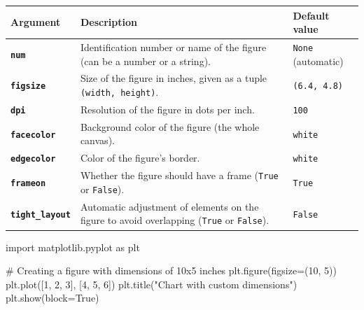 \documentclass[
  english,
  letterpaper,
  DIV=11,
  numbers=noendperiod]{scrreprt}
\newenvironment{Shaded}{\begin{snugshade}}{\end{snugshade}}
\newcommand{\CommentTok}[1]{\textcolor[rgb]{0.37,0.37,0.37}{#1}}
\newcommand{\DecValTok}[1]{\textcolor[rgb]{0.68,0.00,0.00}{#1}}
\newcommand{\ImportTok}[1]{\textcolor[rgb]{0.00,0.46,0.62}{#1}}
\newcommand{\NormalTok}[1]{\textcolor[rgb]{0.00,0.23,0.31}{#1}}
\newcommand{\OperatorTok}[1]{\textcolor[rgb]{0.37,0.37,0.37}{#1}}
\newcommand{\StringTok}[1]{\textcolor[rgb]{0.13,0.47,0.30}{#1}}
\newcommand{\VariableTok}[1]{\textcolor[rgb]{0.07,0.07,0.07}{#1}}
\newcounter{none} %
\begin{document}
{\def\LTcaptype{none} %
\begin{longtable}[]{@{}
  >{\raggedright\arraybackslash}p{}
  >{\raggedright\arraybackslash}p{}
  >{\raggedright\arraybackslash}p{}@{}}
\toprule\noalign{}
\begin{minipage}[b]{\linewidth}\raggedright
Argument
\end{minipage} & \begin{minipage}[b]{\linewidth}\raggedright
Description
\end{minipage} & \begin{minipage}[b]{\linewidth}\raggedright
Default value
\end{minipage} \\
\midrule\noalign{}
\endhead
\bottomrule\noalign{}
\endlastfoot
\textbf{\texttt{num}} & Identification number or name of the figure (can
be a number or a string). & \texttt{None} (automatic) \\
\textbf{\texttt{figsize}} & Size of the figure in inches, given as a
tuple \texttt{(width,\ height)}. & \texttt{(6.4,\ 4.8)} \\
\textbf{\texttt{dpi}} & Resolution of the figure in dots per inch. &
\texttt{100} \\
\textbf{\texttt{facecolor}} & Background color of the figure (the whole
canvas). & \texttt{white} \\
\textbf{\texttt{edgecolor}} & Color of the figure's border. &
\texttt{white} \\
\textbf{\texttt{frameon}} & Whether the figure should have a frame
(\texttt{True} or \texttt{False}). & \texttt{True} \\
\textbf{\texttt{tight\_layout}} & Automatic adjustment of elements on
the figure to avoid overlapping (\texttt{True} or \texttt{False}). &
\texttt{False} \\
\end{longtable}
}

\begin{Shaded}
\begin{Highlighting}[]
\ImportTok{import}\NormalTok{ matplotlib.pyplot }\ImportTok{as}\NormalTok{ plt}

\CommentTok{\# Creating a figure with dimensions of 10x5 inches}
\NormalTok{plt.figure(figsize}\OperatorTok{=}\NormalTok{(}\DecValTok{10}\NormalTok{, }\DecValTok{5}\NormalTok{))}
\NormalTok{plt.plot([}\DecValTok{1}\NormalTok{, }\DecValTok{2}\NormalTok{, }\DecValTok{3}\NormalTok{], [}\DecValTok{4}\NormalTok{, }\DecValTok{5}\NormalTok{, }\DecValTok{6}\NormalTok{])}
\NormalTok{plt.title(}\StringTok{"Chart with custom dimensions"}\NormalTok{)}
\NormalTok{plt.show(block}\OperatorTok{=}\VariableTok{True}\NormalTok{)}
\end{Highlighting}
\end{Shaded}
\end{document}
